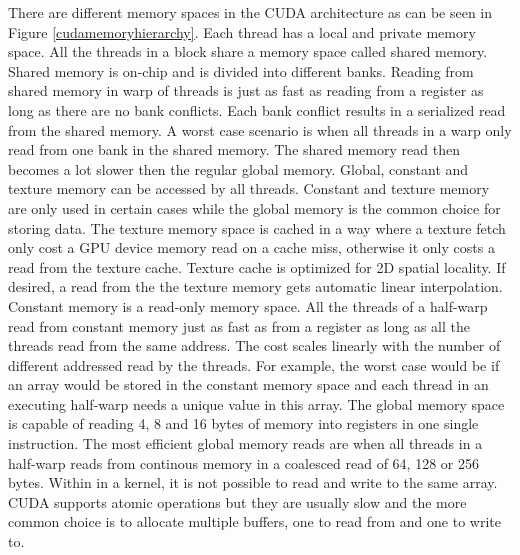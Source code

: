 There are different memory spaces in the CUDA architecture as can be seen in Figure \ref{cudamemoryhierarchy}. Each thread has a local and private memory space. All the threads in a block share a memory space called shared memory. Shared memory is on-chip and is divided into different banks. Reading from shared memory in warp of threads is just as fast as reading from a register as long as there are no bank conflicts. Each bank conflict results in a serialized read from the shared memory. A worst case scenario is when all threads in a warp only read from one bank in the shared memory. The shared memory read then becomes a lot slower then the regular global memory. Global, constant and texture memory can be accessed by all threads. Constant and texture memory are only used in certain cases while the global memory is the common choice for storing data. The texture memory space is cached in a way where a texture fetch only cost a GPU device memory read on a cache miss, otherwise it only costs a read from the texture cache. Texture cache is optimized for 2D spatial locality. If desired, a read from the the texture memory gets automatic linear interpolation. Constant memory is a read-only memory space. All the threads of a half-warp read from constant memory just as fast as from a register as long as all the threads read from the same address. The cost scales linearly with the number of different addressed read by the threads. For example, the worst case would be if an array would be stored in the constant memory space and each thread in an executing half-warp needs a unique value in this array. The global memory space is capable of reading 4, 8 and 16 bytes of memory into registers in one single instruction. The most efficient global memory reads are when all threads in a half-warp reads from continous memory in a coalesced read of 64, 128 or 256 bytes. Within in a kernel, it is not possible to read and write to the same array. CUDA supports atomic operations but they are usually slow and the more common choice is to allocate multiple buffers, one to read from and one to write to.



